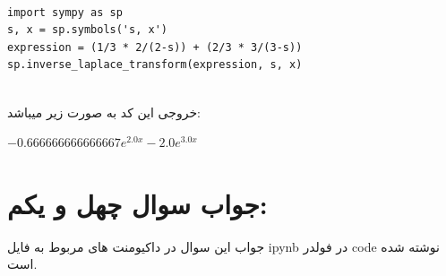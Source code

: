\documentclass[a4paper,14pt]{article}
\begin{document}
\fontsize{12}{12}\selectfont
\begin{latin}
	\begin{lstlisting}
		
import sympy as sp
s, x = sp.symbols('s, x')
expression = (1/3 * 2/(2-s)) + (2/3 * 3/(3-s))
sp.inverse_laplace_transform(expression, s, x)
		
	\end{lstlisting}
\end{latin}
\fontsize{14}{14}\selectfont

خروجی این کد به  صورت زیر میباشد:\\

\begin{latin}
	$-0.666666666666667e^{2.0x} - 2.0e^{3.0x}$
\end{latin}

\section*{جواب سوال چهل و یکم:}

جواب این سوال در داکیومنت های مربوط به فایل ipynb در فولدر code نوشته شده است.
\end{document}
